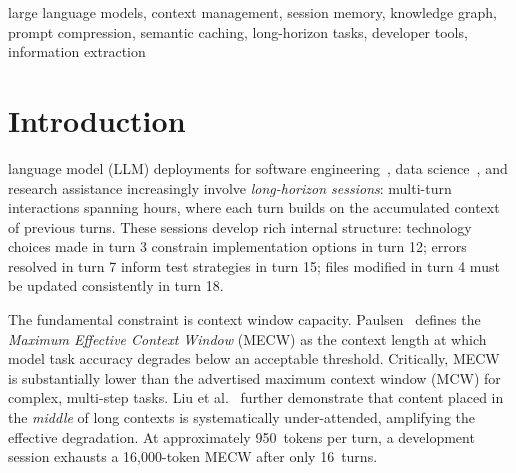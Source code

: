 \documentclass[journal]{IEEEtran}
\begin{document}
\begin{abstract}
Ablation studies establish that fuzzy label matching
contributes $+33$~percentage points of task recall
improvement---the dominant single improvement factor.
The heuristic compression pipeline achieves \textbf{47.3\%}
token reduction without external dependencies.
A novel \textbf{token efficiency} metric---recall per
100 resume tokens---reveals debugging sessions as the
highest-efficiency domain (mean $\eta\!=\!0.91$).

TokenMizer is released as open-source software (MIT licence)
at \url{https://github.com/Shweta-Mishra-ai/tokenmizer}.
\end{abstract}

\begin{IEEEkeywords}
large language models, context management, session memory,
knowledge graph, prompt compression, semantic caching,
long-horizon tasks, developer tools, information extraction
\end{IEEEkeywords}

\section{Introduction}
\label{sec:intro}

 language model (LLM) deployments for
software engineering~\cite{sweagent,copilot}, data
science~\cite{housurvey}, and research assistance increasingly
involve \emph{long-horizon sessions}: multi-turn interactions
spanning hours, where each turn builds on the accumulated
context of previous turns.
These sessions develop rich internal structure: technology
choices made in turn 3 constrain implementation options in
turn 12; errors resolved in turn 7 inform test strategies in
turn 15; files modified in turn 4 must be updated consistently
in turn 18.

The fundamental constraint is context window capacity.
Paulsen~\cite{paulsen2025} defines the \emph{Maximum Effective
Context Window} (MECW) as the context length at which model
task accuracy degrades below an acceptable threshold.
Critically, MECW is substantially lower than the advertised
maximum context window (MCW) for complex, multi-step tasks.
Liu et al.~\cite{lostmiddle} further demonstrate that content
placed in the \emph{middle} of long contexts is systematically
under-attended, amplifying the effective degradation.
At approximately 950~tokens per turn, a development session
exhausts a 16{,}000-token MECW after only 16~turns.
\end{document}
